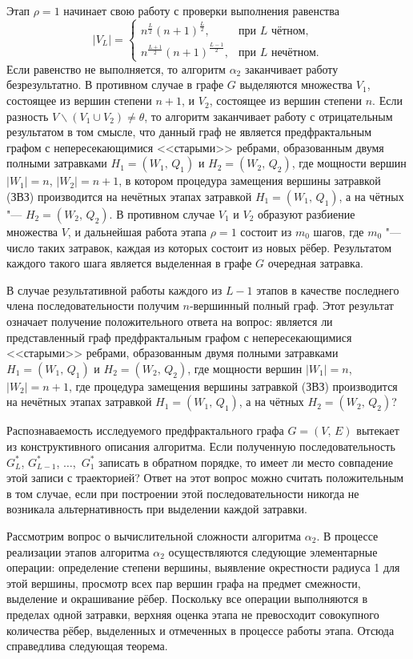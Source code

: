 Этап $\rho =1$ начинает свою работу с проверки выполнения равенства
$$
|V_L|= \begin{cases}
n^{\frac{L}{2}}(n+1)^{\frac{L}{2}}, & \text{при $L$ чётном}, \\
n^{\frac{L+1}{2}}(n+1)^{\frac{L-1}{2}},& \text{при $L$ нечётном}.
\end{cases}
$$
Если равенство не выполняется, то алгоритм $\alpha_2$ заканчивает работу безрезультатно. В противном случае в графе $G$
выделяются множества $V_1$, состоящее из вершин степени $n+1$, и $V_2$, состоящее из вершин степени $n$. Если разность $V
\backslash ( V_1 \cup V_2) \ne \theta$, то алгоритм заканчивает работу с отрицательным результатом в том смысле, что данный граф
не является предфрактальным графом с непересекающимися <<старыми>> ребрами, образованным двумя полными затравками $H_1
=(W_1,\,Q_1)$ и $H_2 =(W_2,\,Q_2)$, где мощности вершин $|W_1|=n$, $|W_2|=n+1$, в котором процедура замещения вершины затравкой
(ЗВЗ) \cite{utakaeva:bib2} производится на нечётных этапах затравкой $H_1 =(W_1,\,Q_1)$, а на чётных "--- $H_2 =(W_2,\,Q_2)$. В
противном случае $V_1$ и $V_2$ образуют разбиение множества $V$, и дальнейшая работа этапа $\rho =1$ состоит из $m_0$ шагов, где
$m_0$ "--- число таких затравок, каждая из которых состоит из новых рёбер. Результатом каждого такого шага является выделенная в
графе $G$ очередная затравка.

В случае результативной работы каждого из $L-1$ этапов в качестве последнего члена последовательности получим $n$-вершинный
полный граф. Этот результат означает получение положительного ответа на вопрос: является ли представленный граф предфрактальным
графом с непересекающимися <<старыми>> ребрами, образованным двумя полными затравками $H_1 =(W_1,\,Q_1)$ и $H_2 =(W_2,\,Q_2)$,
где мощности вершин $|W_1|=n$, $|W_2|=n+1$, где процедура замещения вершины затравкой (ЗВЗ) производится на нечётных этапах
затравкой $H_1 =(W_1,\,Q_1)$, а на чётных $H_2 =(W_2,\,Q_2)$?

Распознаваемость исследуемого предфрактального графа $G=(V,\,E)$ вытекает из конструктивного описания алгоритма. Если полученную
последовательность $G_L^\ast$, $G_{L-1}^\ast$, $\ldots$,\, $G_1^\ast$ записать в обратном порядке, то имеет ли место совпадение
этой записи с траекторией? Ответ на этот вопрос можно считать положительным в том случае, если при построении этой
последовательности никогда не возникала альтернативность при выделении каждой затравки.

Рассмотрим вопрос о вычислительной сложности алгоритма $\alpha_2$. В процессе реализации этапов алгоритма $\alpha_2$
осуществляются следующие элементарные операции: определение степени вершины, выявление окрестности радиуса 1 для этой вершины,
просмотр всех пар вершин графа на предмет смежности, выделение и окрашивание рёбер. Поскольку все операции выполняются в пределах
одной затравки, верхняя оценка этапа не превосходит совокупного количества рёбер, выделенных и отмеченных в процессе работы
этапа. Отсюда справедлива следующая теорема.

